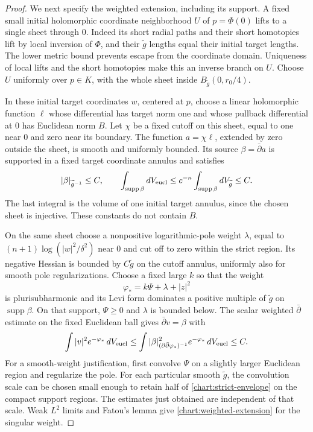 \documentclass[11pt]{article}
\theoremstyle{definition}
\theoremstyle{remark}
\newcommand{\dd}{\partial\bar\partial}
\newcommand{\dbar}{\bar\partial}
\DeclareMathOperator{\supp}{supp}
\numberwithin{equation}{section}
\begin{document}
\begin{proof}
We next specify the weighted extension, including its support.
A fixed small initial holomorphic coordinate neighborhood $U$
of $p=\Phi(0)$ lifts to a single sheet through $0$.  Indeed its
short radial paths and their short homotopies lift by local
inversion of $\Phi$, and their $\widetilde g$ lengths equal
their initial target lengths.  The lower metric bound prevents
escape from the coordinate domain.  Uniqueness of local lifts
and the short homotopies make this an inverse branch on $U$.
Choose $U$ uniformly over $p\in K$, with the whole sheet inside
$B_{\widetilde g}(0,r_0/4)$.

In these initial target coordinates $w$, centered at $p$, choose
a linear holomorphic function $\ell$ whose differential has
target norm one and whose pullback differential at $0$ has
Euclidean norm $B$.  Let $\chi$ be a fixed cutoff on this sheet,
equal to one near $0$ and zero near its boundary.  The function
$a=\chi\ell$, extended by zero outside the sheet, is smooth and
uniformly bounded.  Its source $\beta=\dbar a$ is supported in
a fixed target coordinate annulus and satisfies
\[
 |\beta|_{\widetilde g^{-1}}\le C,
 \qquad
 \int_{\supp\beta}dV_{\rm eucl}
 \le c^{-n}\int_{\supp\beta}dV_{\widetilde g}
 \le C.
\]
The last integral is the volume of one initial target annulus,
since the chosen sheet is injective.  These constants do not
contain $B$.

On the same sheet choose a nonpositive logarithmic-pole weight
$\lambda$, equal to $(n+1)\log(|w|^2/\delta^2)$ near $0$ and
cut off to zero within the strict region.  Its negative Hessian
is bounded by $C\widetilde g$ on the cutoff annulus, uniformly
also for smooth pole regularizations.  Choose a fixed large
$k$ so that the weight
\[
 \varphi_*=k\Psi+\lambda+|z|^2
\]
is plurisubharmonic and its Levi form dominates a positive
multiple of $\widetilde g$ on $\supp\beta$.
On that support, $\Psi\ge0$ and $\lambda$ is bounded below.
The scalar weighted $\dbar$ estimate on the fixed Euclidean
ball \cite{Hormander}\cite[Theorem~5.1 and Remark~4.5]{Demailly} gives
$\dbar v=\beta$ with
\begin{equation}\label{chart:weighted-extension}
 \int |v|^2e^{-\varphi_*}\,dV_{\rm eucl}
 \le\int |\beta|^2_{(\dd\varphi_*)^{-1}}
                  e^{-\varphi_*}\,dV_{\rm eucl}\le C.
\end{equation}
For a smooth-weight justification, first convolve $\Psi$ on
a slightly larger Euclidean region and regularize the pole.
For each particular smooth $\widetilde g$, the convolution
scale can be chosen small enough to retain half of
\eqref{chart:strict-envelope} on the compact support regions.
The estimates just obtained are independent of that scale.
Weak $L^2$ limits and Fatou's lemma give
\eqref{chart:weighted-extension} for the singular weight.


\end{proof}
\end{document}
